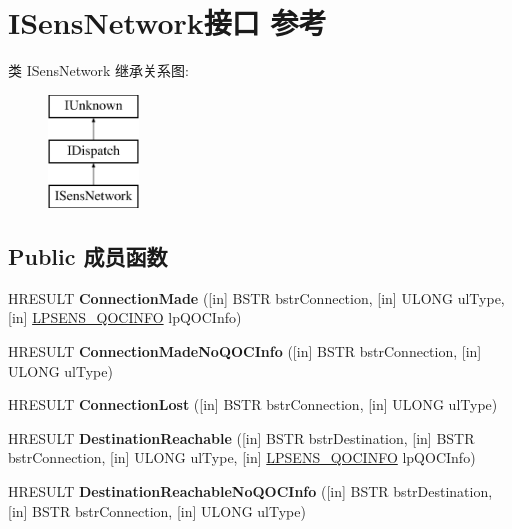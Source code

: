 \hypertarget{interface_i_sens_network}{}\section{I\+Sens\+Network接口 参考}
\label{interface_i_sens_network}
类 I\+Sens\+Network 继承关系图\+:\begin{figure}[H]
\begin{center}
\leavevmode
\includegraphics[height=3.000000cm]{interface_i_sens_network}
\end{center}
\end{figure}
\subsection*{Public 成员函数}
\begin{DoxyCompactItemize}
\item 
\mbox{\label{interface_i_sens_network_adb330bc8af26c57a62016cff90c19083}} 
H\+R\+E\+S\+U\+LT {\bfseries Connection\+Made} (\mbox{[}in\mbox{]} B\+S\+TR bstr\+Connection, \mbox{[}in\mbox{]} U\+L\+O\+NG ul\+Type, \mbox{[}in\mbox{]} \hyperlink{struct_s_e_n_s___q_o_c_i_n_f_o}{L\+P\+S\+E\+N\+S\+\_\+\+Q\+O\+C\+I\+N\+FO} lp\+Q\+O\+C\+Info)
\item 
\mbox{\label{interface_i_sens_network_abfb0db0574ceb378623bc986ac4e38b4}} 
H\+R\+E\+S\+U\+LT {\bfseries Connection\+Made\+No\+Q\+O\+C\+Info} (\mbox{[}in\mbox{]} B\+S\+TR bstr\+Connection, \mbox{[}in\mbox{]} U\+L\+O\+NG ul\+Type)
\item 
\mbox{\label{interface_i_sens_network_ae255b74bb60c4d59e298ac70f4d86b2d}} 
H\+R\+E\+S\+U\+LT {\bfseries Connection\+Lost} (\mbox{[}in\mbox{]} B\+S\+TR bstr\+Connection, \mbox{[}in\mbox{]} U\+L\+O\+NG ul\+Type)
\item 
\mbox{\label{interface_i_sens_network_a8df975b27903eb83a8be6ad8e23e34fa}} 
H\+R\+E\+S\+U\+LT {\bfseries Destination\+Reachable} (\mbox{[}in\mbox{]} B\+S\+TR bstr\+Destination, \mbox{[}in\mbox{]} B\+S\+TR bstr\+Connection, \mbox{[}in\mbox{]} U\+L\+O\+NG ul\+Type, \mbox{[}in\mbox{]} \hyperlink{struct_s_e_n_s___q_o_c_i_n_f_o}{L\+P\+S\+E\+N\+S\+\_\+\+Q\+O\+C\+I\+N\+FO} lp\+Q\+O\+C\+Info)
\item 
\mbox{\label{interface_i_sens_network_a050815bc1ba6876f0a43cd433beb748d}} 
H\+R\+E\+S\+U\+LT {\bfseries Destination\+Reachable\+No\+Q\+O\+C\+Info} (\mbox{[}in\mbox{]} B\+S\+TR bstr\+Destination, \mbox{[}in\mbox{]} B\+S\+TR bstr\+Connection, \mbox{[}in\mbox{]} U\+L\+O\+NG ul\+Type)
\end{DoxyCompactItemize}

